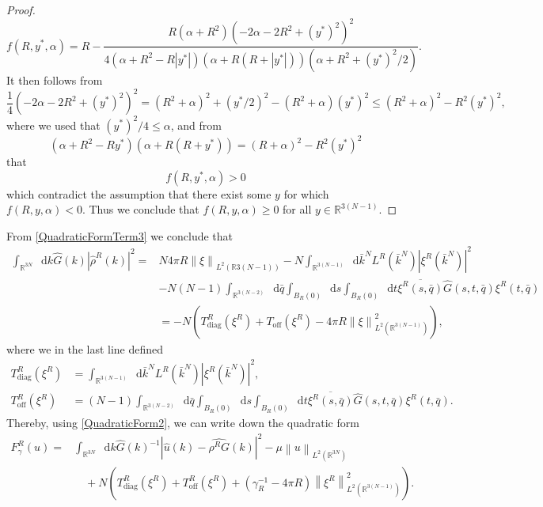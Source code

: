 \documentclass[a4paper,11pt]{article}
\newcommand{\norm}[1]{\left\lVert #1 \right\rVert}
\newcommand{\abs}[1]{\left\lvert #1 \right\rvert}
\newcommand*\diff{\mathop{}\!\mathrm{d}}
\newcommand{\R}{\mathbb{R}}
\numberwithin{equation}{section}
\begin{document}
\begin{proof}
\begin{equation}
	f(R,y^*,\alpha)=R-\frac{R \left(\alpha +R^2\right) \left(-2 \alpha -2 R^2+(y^*)^2\right)^2}{4 \left(\alpha +R^2-R \abs{y^*}\right) (\alpha +R (R+\abs{y^*})) \left( \alpha + R^2+(y^*)^2/2\right)}.
	\end{equation}
	It then follows from \begin{equation}
	\frac{1}{4}\left(-2 \alpha -2 R^2+(y^*)^2\right)^2=(R^2+\alpha)^2+(y^*/2)^2-(R^2+\alpha)(y^*)^2\leq(R^2+\alpha)^2-R^2(y^*)^2,
	\end{equation}
	where we used that $ (y^*)^2/4\leq\alpha $, and from \begin{equation}
	\left(\alpha +R^2-R y^*\right) (\alpha +R (R+y^*))=(R+\alpha)^2-R^2(y^*)^2
	\end{equation}
	that \begin{equation}
	f(R,y^*,\alpha)> 0
	\end{equation}
	which contradict the assumption that there exist some $ y $ for which $ f(R,y,\alpha)<0 $. Thus we conclude that $ f(R,y,\alpha)\geq0 $ for all $ y\in\R^{3(N-1)} $.
\end{proof}
\vspace{0.5cm}
From \eqref{QuadraticFormTerm3} we conclude that \begin{equation}
\begin{aligned}
\int_{\R^{3N}}\diff k\hat{G}(k)\abs{\hat{\rho}^R(k)}^2=&N4\pi R \norm{\xi}_{L^2(\R{3(N-1)})}-N\int_{\R^{3(N-1)}}\diff \bar{k}^N L^R(\bar{k}^N) \abs{\xi^R(\bar{k}^N)}^2\\&-N(N-1)\int_{\R^{3(N-2)}}\diff \bar{q}\int_{B_R(0)}\diff s\int_{B_R(0)}\diff t \overline{\xi^R(s,\bar{q})}\hat{G}(s,t,\bar{q})\xi^R(t,\bar{q})\\
&= -N\left(T_{\text{diag}}^R(\xi^R)+T_{\text{off}}(\xi^R)-4\pi R\norm{\xi}_{L^2(\R^{3(N-1)})}^2\right),
\end{aligned}
\end{equation}
where we in the last line defined\begin{equation}
\begin{aligned}
T^R_{\text{diag}}(\xi^R)&=\int_{\R^{3(N-1)}}\diff \bar{k}^N L^R(\bar{k}^N) \abs{\xi^R(\bar{k}^N)}^2,\\
T^R_{\text{off}}(\xi^R)&=(N-1)\int_{\R^{3(N-2)}}\diff \bar{q}\int_{B_R(0)}\diff s\int_{B_R(0)}\diff t \overline{\xi^R(s,\bar{q})}\hat{G}(s,t,\bar{q})\xi^R(t,\bar{q}).
\end{aligned}
\end{equation}
Thereby, using \eqref{QuadraticForm2}, we can write down the quadratic form\begin{equation}
\begin{aligned}
F_\gamma^R(u)=&\int_{\R^{3N}}\diff k \hat{G}(k)^{-1}|\hat{u}(k)-\widehat{\rho^R G}(k)|^2-\mu\norm{u}_{L^2(\R^{3N})}\\&\quad+N\left(T^R_{\text{diag}}(\xi^R)+T^R_{\text{off}}(\xi^R)+(\gamma_R^{-1}-4\pi R)\norm{\xi^R}_{L^2(\R^{3(N-1)})}^2\right).
\end{aligned}
\end{equation}
\end{document}
